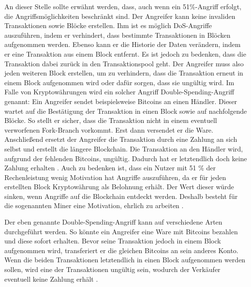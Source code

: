 An dieser Stelle sollte erwähnt werden, dass, auch wenn ein 51\%-Angriff erfolgt, die Angriffsmöglichkeiten beschränkt sind. Der Angreifer kann keine invaliden Transaktionen sowie Blöcke erstellen. Ihm ist es möglich \acs{DoS}-Angriffe auszuführen, indem er verhindert, dass bestimmte Transaktionen in Blöcken aufgenommen werden. Ebenso kann er die Historie der Daten verändern, indem er eine Transaktion aus einem Block entfernt. Es ist jedoch zu bedenken, dass die Transaktion dabei zurück in den Transaktionspool geht. Der Angreifer muss also jeden weiteren Block erstellen, um zu verhindern, dass die Transaktion erneut in einem Block aufgenommen wird oder dafür sorgen, dass sie ungültig wird. Im Falle von Kryptowährungen wird ein solcher Angriff Double-Spending-Angriff genannt: Ein Angreifer sendet beispielsweise Bitcoins an einen Händler. Dieser wartet auf die Bestätigung der Transaktion in einen Block sowie auf nachfolgende Blöcke. So stellt er sicher, dass die Transaktion nicht in einem eventuell verworfenen Fork-Branch vorkommt. Erst dann versendet er die Ware. Anschließend ersetzt der Angreifer die Transaktion durch eine Zahlung an sich selbst und erstellt die längere Blockchain. Die Transaktion an den Händler wird, aufgrund der fehlenden Bitcoins, ungültig. Dadurch hat er letztendlich doch keine Zahlung erhalten \cite{EthereumTeamEthereumWhitePaper2017}. Auch zu bedenken ist, dass ein Nutzer mit 51 \% der Rechenleistung wenig Motivation hat Angriffe auszuführen, da er für jeden erstellten Block Kryptowährung als Belohnung erhält. Der Wert dieser würde sinken, wenn Angriffe auf die Blockchain entdeckt werden. Deshalb besteht für die sogenannten Miner eine Motivation, ehrlich zu arbeiten \cite[S.196 ff.]{AntonopoulosMasteringbitcoin2015}.

Der eben genannte Double-Spending-Angriff kann auf verschiedene Arten durchgeführt werden. So könnte ein Angreifer eine Ware mit Bitcoins bezahlen und diese sofort erhalten. Bevor seine Transaktion jedoch in einem Block aufgenommen wird, transferiert er die gleichen Bitcoins an sein anderes Konto. Wenn die beiden Transaktionen letztendlich in einen Block aufgenommen werden sollen, wird eine der Transaktionen ungültig sein, wodurch der Verkäufer eventuell keine Zahlung erhält \cite[S.~211 ff.]{AntonopoulosMasteringbitcoin2015}.

